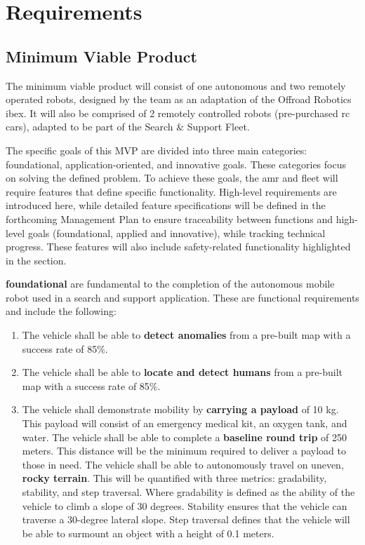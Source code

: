\section{Requirements}
\label{sec:requirements}

\subsection{Minimum Viable Product}
\label{sec:mvp}

The minimum viable product will consist of one autonomous and two remotely operated robots, designed by the team as an adaptation of the Offroad Robotics \gls{ibex}. It will also be comprised of 2 remotely controlled robots (pre-purchased \gls{rc} cars), adapted to be part of the Search \& Support Fleet.

The specific goals of this MVP are divided into three main categories: foundational, application-oriented, and innovative goals. These categories focus on solving the defined problem. To achieve these goals, the \gls{amr} and \gls{fleet} will require \gls{features} that define specific functionality. High-level requirements are introduced here, while detailed feature specifications will be defined in the forthcoming Management Plan to ensure traceability between functions and high-level goals (\gls{foundational}, \gls{applied} and \gls{innovative}), while tracking technical progress. These \gls{features} will also include safety-related functionality highlighted in the  section.

\textbf{\gls{foundational}} are fundamental to the completion of the autonomous mobile robot used in a search and support application. These are functional requirements and include the following:

\begin{enumerate}
    \item The vehicle shall be able to \textbf{detect \gls{anomalies}} from a pre-built map with a success rate of 85\%.
    \item The vehicle shall be able to \textbf{locate and detect humans} from a pre-built map with a success rate of 85\%.
    \item The vehicle shall demonstrate mobility by \textbf{carrying a \gls{payload}} of 10 kg. This \gls{payload} will consist of an emergency medical kit, an oxygen tank, and water. The vehicle shall be able to complete a \textbf{baseline round trip} of 250 meters. This distance will be the minimum required to deliver a payload to those in need. The vehicle shall be able to autonomously travel on uneven, \textbf{rocky terrain}. This will be quantified with three metrics: gradability, stability, and step traversal. Where gradability is defined as the ability of the vehicle to climb a slope of 30 degrees. Stability ensures that the vehicle can traverse a 30-degree lateral slope. Step traversal defines that the vehicle will be able to surmount an object with a height of 0.1 meters.
\end{enumerate}

